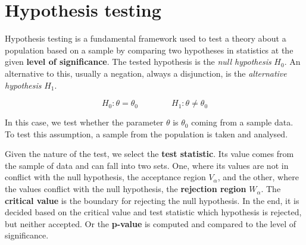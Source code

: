 








\section{Hypothesis testing}

Hypothesis testing is a fundamental framework used to test a theory about a population based on a sample by comparing two hypotheses in statistics at the given \textbf{level of significance}. The tested hypothesis is the \textit{null hypothesis} $H_0$. An alternative to this, usually a negation, always a disjunction, is the \textit{alternative hypothesis} $H_1$. 

\begin{equation}
    H_0: \theta = \theta_0 \qquad \qquad H_1:  \theta \ne \theta_0
\end{equation}

In this case, we test whether the parameter $\theta$ is $\theta_0$ coming from a sample data. To test this assumption, a sample from the population is taken and analysed.  

Given the nature of the test, we select the \textbf{test statistic}. Its value comes from the sample of data and can fall into two sets. One, where its values are not in conflict with the null hypothesis, the acceptance region $V_\alpha$, and the other, where the values conflict with the null hypothesis, the \textbf{rejection region} $W_\alpha$. The \textbf{critical value} is the boundary for rejecting the null hypothesis. In the end, it is decided based on the critical value and test statistic which hypothesis is rejected, but neither accepted. Or the \textbf{p-value} is computed and compared to the level of significance. \cite{Mala2024, Marek2024}

